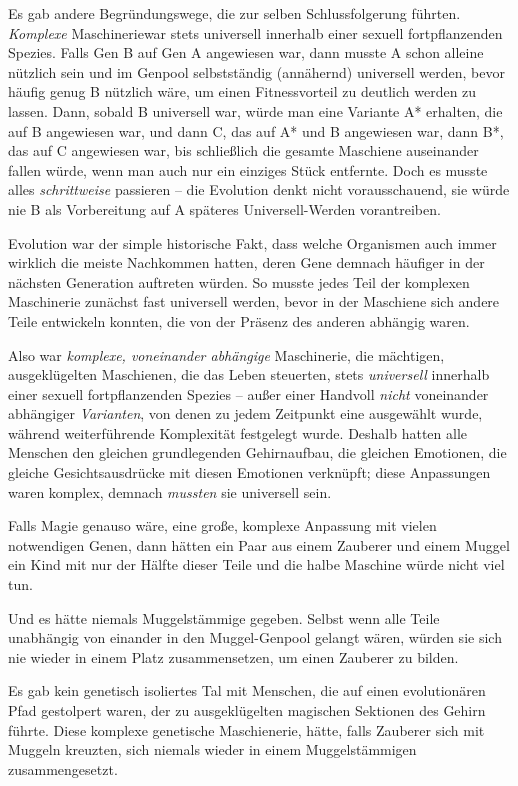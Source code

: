{Es gab andere Begründungswege, die zur selben Schlussfolgerung führten. \emph{Komplexe} Maschineriewar stets universell innerhalb einer sexuell fortpflanzenden Spezies. Falls Gen B auf Gen A angewiesen war, dann musste A schon alleine nützlich sein und im Genpool selbstständig (annähernd) universell werden, bevor häufig genug B nützlich wäre, um einen Fitnessvorteil zu deutlich werden zu lassen. Dann, sobald B universell war, würde man eine Variante A* erhalten, die auf B angewiesen war, und dann C, das auf A* und B angewiesen war, dann B*, das auf C angewiesen war, bis schließlich die gesamte Maschiene auseinander fallen würde, wenn man auch nur ein einziges Stück entfernte. Doch es musste alles \emph{schrittweise} passieren -- die Evolution denkt nicht vorausschauend, sie würde nie B als Vorbereitung auf A späteres Universell-Werden vorantreiben.

Evolution war der simple historische Fakt, dass welche Organismen auch immer wirklich die meiste Nachkommen hatten, deren Gene demnach häufiger in der nächsten Generation auftreten würden. So musste jedes Teil der komplexen Maschinerie zunächst fast universell werden, bevor in der Maschiene sich andere Teile entwickeln konnten, die von der Präsenz des anderen abhängig waren.

Also war \emph{komplexe, voneinander abhängige} Maschinerie, die mächtigen, ausgeklügelten Maschienen, die das Leben steuerten, stets \emph{universell} innerhalb einer sexuell fortpflanzenden Spezies -- außer einer Handvoll \emph{nicht} voneinander abhängiger \emph{Varianten}, von denen zu jedem Zeitpunkt eine ausgewählt wurde, während weiterführende Komplexität festgelegt wurde. Deshalb hatten alle Menschen den gleichen grundlegenden Gehirnaufbau, die gleichen Emotionen, die gleiche Gesichtsausdrücke mit diesen Emotionen verknüpft; diese Anpassungen waren komplex, demnach \emph{mussten} sie universell sein.

Falls Magie genauso wäre, eine große, komplexe Anpassung mit vielen notwendigen Genen, dann hätten ein Paar aus einem Zauberer und einem Muggel ein Kind mit nur der Hälfte dieser Teile und die halbe Maschine würde nicht viel tun.

Und es hätte niemals Muggelstämmige gegeben. Selbst wenn alle Teile unabhängig von einander in den Muggel-Genpool gelangt wären, würden sie sich nie wieder in einem Platz zusammensetzen, um einen Zauberer zu bilden.

Es gab kein genetisch isoliertes Tal mit Menschen, die auf einen evolutionären Pfad gestolpert waren, der zu ausgeklügelten magischen Sektionen des Gehirn führte. Diese komplexe genetische Maschienerie, hätte, falls Zauberer sich mit Muggeln kreuzten, sich niemals wieder in einem Muggelstämmigen zusammengesetzt.

}
